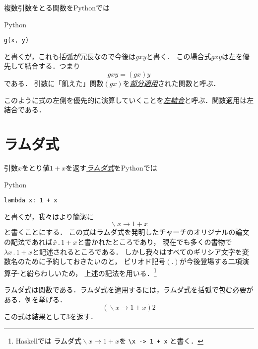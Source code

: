 \documentclass[a5paper,draft]{jsbook}
\newcommand{\programminglanguage}[1]{\textsf{#1}}
\newcommand{\haskell}{\programminglanguage{Haskell}}
\newcommand{\python}{\programminglanguage{Python}}
\newcommand{\keyword}[1]{{\underline{\emph{#1}}}}
\newcommand{\code}[1]{\texttt{#1}}
\newenvironment{pythoncode}{\begin{itembox}[r]{\python}}{\end{itembox}}
\newcommand{\pthnId}[1]{\textit{#1}}
\newcommand{\pthnKeyword}[1]{\textbf{#1}}
\newcommand{\pthnOp}[1]{\texttt{#1}}
\newcommand{\mathUnaryOperator}[1]{\operatorname{#1}}
\newcommand{\mathLambda}{\mathUnaryOperator{\backslash}}
\newcommand{\mathLambdaArrow}{\rightarrow}
\newcommand{\mathLambdaExpression}[2]{\mathLambda#1\mathLambdaArrow#2}
\begin{document}
複数引数をとる関数を\python では
\begin{pythoncode}
\begin{verbatim}
g(x, y)
\end{verbatim}
\end{pythoncode}
と書くが，これも括弧が冗長なので今後は$gxy$と書く．
この場合式$gxy$は左を優先して結合する．つまり
\begin{equation}
gxy=\left(gx\right)y
\end{equation}
である．
引数に「飢えた」関数$\left(gx\right)$を\keyword{部分適用}された関数と呼ぶ．

このように式の左側を優先的に演算していくことを\keyword{左結合}と呼ぶ．関数適用は左結合である．

\section{ラムダ式}

引数$x$をとり値$1+x$を返す\keyword{ラムダ式}を\python では
\begin{pythoncode}
\begin{verbatim}
lambda x: 1 + x
\end{verbatim}
\end{pythoncode}
と書くが，我々はより簡潔に
\begin{equation}
\mathLambdaExpression{x}{1+x}
\end{equation}
と書くことにする．
この式はラムダ式を発明したチャーチのオリジナルの論文の記法であれば$\Hat x\,.\,1+x$と書かれたところであり，
現在でも多くの書物で$\lambda x\,.\,1+x$と記述されるところである．
しかし我々はすべてのギリシア文字を変数名のために予約しておきたいのと，
ピリオド記号$\left(.\right)$が今後登場する二項演算子$\cdot$と紛らわしいため，
上述の記法を用いる．\footnote{\haskell では
ラムダ式$\mathLambdaExpression{x}{1+x}$を \code{\textbackslash x -> 1 + x} と書く．}

ラムダ式は関数である．ラムダ式を適用するには，ラムダ式を括弧で包む必要がある．例を挙げる．
\begin{equation}
\left(\mathLambdaExpression{x}{1+x}\right)2
\end{equation}
この式は結果として$3$を返す．
\end{document}
